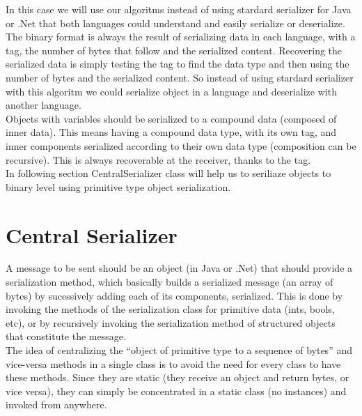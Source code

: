 In this case we will use our algoritms instead of using stardard serializer for Java or .Net that both languages could
understand and easily serialize or deserialize.\\

The binary format is always the result of serializing data in each language, with a tag, the number of bytes that follow and
the serialized content. Recovering the serialized data is simply testing the tag to find the data type and then using the
number of bytes and the serialized content. So instead of using stardard serializer with this algoritm we could serialize object
in a language and deserialize with another language.\\

Objects with variables should be serialized to a compound data (composed of inner data). This means having a compound data type,
 with its own tag, and inner components serialized according to their own data type (composition can be recursive).
 This is always recoverable at the receiver, thanks to the tag.\\

In following section CentralSerializer class will help us to seriliaze objects to binary level using primitive type
object serialization.\\


\section{Central Serializer}
\label{section:centralSerializer}

A message to be sent should be an object (in Java or .Net) that should provide a serialization method, which basically
builds a serialized message (an array of bytes) by sucessively adding each of its components, serialized. This is done by
invoking the methods of the serialization class for primitive data (ints, bools, etc), or by recursively invoking the
serialization method of structured objects that constitute the message.\\

The idea of centralizing the “object of primitive type to a sequence of bytes” and vice-versa methods in a single class
is to avoid the need for every class to have these methods. Since they are static (they receive an object and return bytes,
or vice versa), they can simply be concentrated in a static class (no instances) and invoked from anywhere.\\

